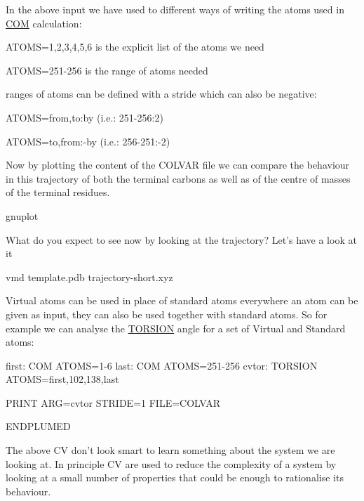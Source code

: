 In the above input we have used to different ways of writing the atoms used in \hyperlink{COM}{C\+O\+M} calculation\+:


\begin{DoxyEnumerate}
\item A\+T\+O\+M\+S=1,2,3,4,5,6 is the explicit list of the atoms we need
\item A\+T\+O\+M\+S=251-\/256 is the range of atoms needed
\end{DoxyEnumerate}

ranges of atoms can be defined with a stride which can also be negative\+:


\begin{DoxyEnumerate}
\item A\+T\+O\+M\+S=from,to\+:by (i.\+e.\+: 251-\/256\+:2)
\item A\+T\+O\+M\+S=to,from\+:-\/by (i.\+e.\+: 256-\/251\+:-\/2)
\end{DoxyEnumerate}

Now by plotting the content of the C\+O\+L\+V\+A\+R file we can compare the behaviour in this trajectory of both the terminal carbons as well as of the centre of masses of the terminal residues.

\begin{DoxyVerb}gnuplot
\end{DoxyVerb}


What do you expect to see now by looking at the trajectory? Let's have a look at it

\begin{DoxyVerb}vmd template.pdb trajectory-short.xyz 
\end{DoxyVerb}


Virtual atoms can be used in place of standard atoms everywhere an atom can be given as input, they can also be used together with standard atoms. So for example we can analyse the \hyperlink{TORSION}{T\+O\+R\+S\+I\+O\+N} angle for a set of Virtual and Standard atoms\+:

\begin{DoxyVerb}first: COM ATOMS=1-6
last: COM ATOMS=251-256
cvtor: TORSION ATOMS=first,102,138,last

PRINT ARG=cvtor STRIDE=1 FILE=COLVAR 

ENDPLUMED
\end{DoxyVerb}


The above C\+V don't look smart to learn something about the system we are looking at. In principle C\+V are used to reduce the complexity of a system by looking at a small number of properties that could be enough to rationalise its behaviour.

